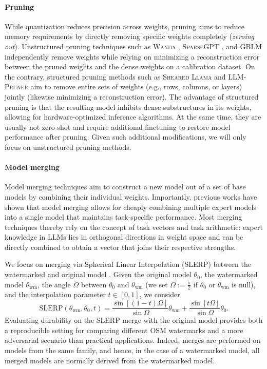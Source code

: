 \paragraph{Pruning} 
While quantization reduces precision across weights, pruning aims to reduce memory requirements by directly removing specific weights completely (\textit{zeroing out}).
Unstructured pruning techniques such as \textsc{Wanda} \citep{wanda}, \textsc{SparseGPT} \citep{sparsegpt}, and \textsc{GBLM} \citep{gblm_pruner} independently remove weights while relying on minimizing a reconstruction error between the pruned weights and the dense weights on a calibration dataset. 
On the contrary, structured pruning methods such as \textsc{Sheared Llama} \citep{sheared_llm} and \textsc{LLM-Pruner} \citep{llm_pruner} aim to remove entire sets of weights (e.g., rows, columns, or layers) jointly (likewise minimizing a reconstruction error).
The advantage of structured pruning is that the resulting model inhibits dense substructures in its weights, allowing for hardware-optimized inference algorithms. 
At the same time, they are usually not zero-shot and require additional finetuning to restore model performance after pruning.  
Given such additional modifications, we will only focus on unstructured pruning methods.

\paragraph{Model merging}
Model merging techniques aim to construct a new model out of a set of base models by combining their individual weights. 
Importantly, previous works \citep{fischer_merging, dataless_merging} have shown that model merging allows for cheaply combining multiple expert models into a single model that maintains task-specific performance. 
Most merging techniques \citep{fischer_merging, dataless_merging, ties_merging, dare_merging} thereby rely on the concept of task vectors and task arithmetic: expert knowledge in LLMs lies in orthogonal directions in weight space and can be directly combined to obtain a vector that joins their respective strengths.

We focus on merging via Spherical Linear Interpolation (\textsc{SLERP}) between the watermarked and original model \citep{mergekit}.
Given the original model $\theta_0$, the watermarked model $\theta_{\text{wm}}$, the angle $\Omega$ between $\theta_0$ and $\theta_{\text{wm}}$ (we set $\Omega := \frac{\pi}{2}$ if $\theta_0$ or $\theta_{\text{wm}}$ is null), and the interpolation parameter $t \in [0,1]$, we consider  
\begin{equation} 
 \text{SLERP}(\theta_{\text{wm}},\theta_0, t) = \frac{\sin[(1-t) \Omega]}{\sin\Omega} \theta_{\text{wm}} + \frac{\sin[t\Omega]}{\sin \Omega} \theta_0.
\end{equation}
Evaluating durability on the \textsc{SLERP} merge with the original model provides both a reproducible setting for comparing different OSM watermarks and a more adversarial scenario than practical applications.  
Indeed, merges are performed on models from the same family, and hence, in the case of a watermarked model, all merged models are normally derived from the watermarked model.  

